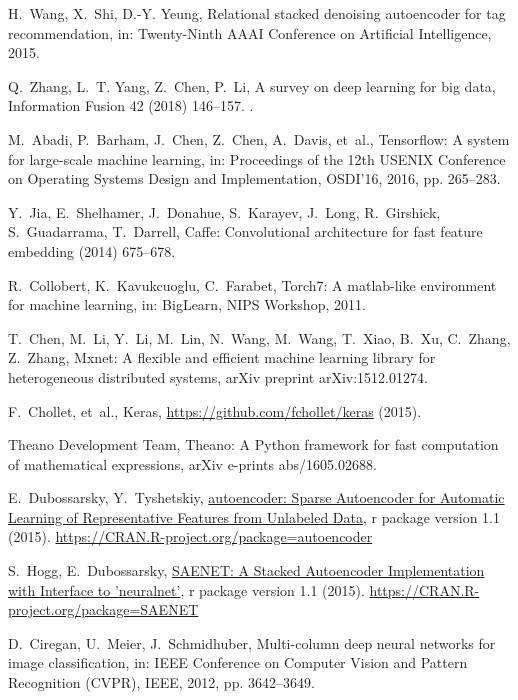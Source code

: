 \documentclass[preprint,5p,compress]{elsarticle}
\begin{document}
\begin{thebibliography}{100}
H.~Wang, X.~Shi, D.-Y. Yeung, Relational stacked denoising autoencoder for tag
  recommendation, in: Twenty-Ninth AAAI Conference on Artificial Intelligence,
  2015.

Q.~Zhang, L.~T. Yang, Z.~Chen, P.~Li, A survey on deep learning for big data,
  Information Fusion 42 (2018) 146--157.
\newblock \href {http://dx.doi.org/10.1016/j.inffus.2017.10.006}
  {}.

M.~Abadi, P.~Barham, J.~Chen, Z.~Chen, A.~Davis, et~al., Tensorflow: A system
  for large-scale machine learning, in: Proceedings of the 12th USENIX
  Conference on Operating Systems Design and Implementation, OSDI'16, 2016, pp.
  265--283.

Y.~Jia, E.~Shelhamer, J.~Donahue, S.~Karayev, J.~Long, R.~Girshick,
  S.~Guadarrama, T.~Darrell, Caffe: Convolutional architecture for fast feature
  embedding (2014) 675--678.

R.~Collobert, K.~Kavukcuoglu, C.~Farabet, Torch7: A matlab-like environment for
  machine learning, in: BigLearn, NIPS Workshop, 2011.

T.~Chen, M.~Li, Y.~Li, M.~Lin, N.~Wang, M.~Wang, T.~Xiao, B.~Xu, C.~Zhang,
  Z.~Zhang, Mxnet: A flexible and efficient machine learning library for
  heterogeneous distributed systems, arXiv preprint arXiv:1512.01274.

F.~Chollet, et~al., Keras, \url{https://github.com/fchollet/keras} (2015).

{Theano Development Team}, {Theano: A {Python} framework for fast computation
  of mathematical expressions}, arXiv e-prints abs/1605.02688.

E.~Dubossarsky, Y.~Tyshetskiy,
  \href{https://CRAN.R-project.org/package=autoencoder}{autoencoder: Sparse
  Autoencoder for Automatic Learning of Representative Features from Unlabeled
  Data}, r package version 1.1 (2015).
\newline\urlprefix\url{https://CRAN.R-project.org/package=autoencoder}

S.~Hogg, E.~Dubossarsky,
  \href{https://CRAN.R-project.org/package=SAENET}{SAENET: A Stacked
  Autoencoder Implementation with Interface to 'neuralnet'}, r package version
  1.1 (2015).
\newline\urlprefix\url{https://CRAN.R-project.org/package=SAENET}

D.~Ciregan, U.~Meier, J.~Schmidhuber, Multi-column deep neural networks for
  image classification, in: IEEE Conference on Computer Vision and Pattern
  Recognition (CVPR), IEEE, 2012, pp. 3642--3649.

\end{thebibliography}
\end{document}
